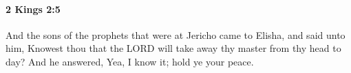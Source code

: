 
		\paragraph{2 Kings 2:5} %
			\label{2KINGS-2-5}

			And the sons of the prophets that were at Jericho came to Elisha, and said unto him, Knowest thou that the LORD will take away thy master from thy head to day? And he answered, Yea, I know it; hold ye your peace.


